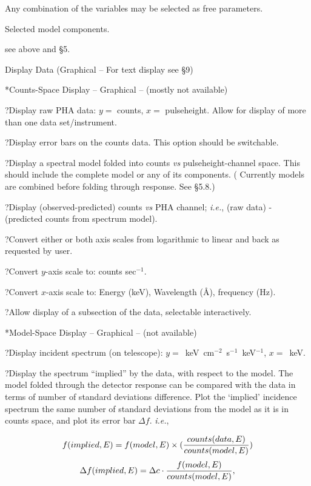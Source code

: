 {\list

Any combination of the variables may be selected as free parameters.


Selected model components.


see above and \S5.

}

\@{Display Data} (Graphical -- For text display see \S9)

\**Counts-Space Display -- Graphical -- (mostly not available)

\??Display raw PHA data:  $y=$ counts, $x=$ pulseheight.  Allow for display of
more than one data set/instrument.

\??Display error bars on the counts data.  This option should be switchable.

\??Display a spectral model folded into counts {\it vs} pulseheight-channel
space.  This should include the complete model or any of its
components.  ( Currently models are combined
before folding through response. See \S 5.8.)

\??Display (observed-predicted) counts {\it vs} PHA channel; 
{\it i.e.}, (raw data) -
(predicted counts from spectrum model).

\??Convert either or both axis scales from logarithmic to linear and
back as requested by user.

\??Convert $y$-axis scale to:  counts sec$^{-1}$.

\??Convert $x$-axis scale to:  Energy (keV), Wavelength (\AA), frequency
(Hz).

\??Allow display of a subsection of the data, selectable interactively.

\**Model-Space Display -- Graphical -- (not available)

\??Display incident spectrum (on telescope):
$y=$~keV~cm$^{-2}$~s$^{-1}$~keV$^{-1}$, $x=$~keV.

\??Display the spectrum ``implied'' by the data, with respect to
the model.  The model folded through the detector response can be
compared with the data in terms of number of standard deviations
difference.  Plot the `implied' incidence spectrum the same number
of standard deviations from the model as it is in counts space, and plot its
error bar $\Delta f$. {\it i.e.},

$$f(implied,E) = f(model, E) \times ({counts(data,E)\over counts(model, E)})$$
$$\Delta f(implied,E) = \Delta c \cdot {f(model,E)\over counts(model,E)},$$

